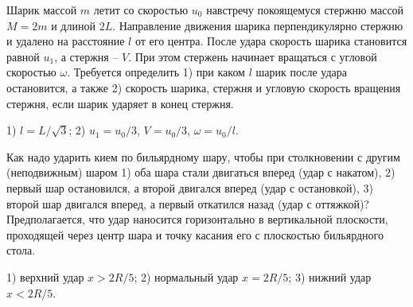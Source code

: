 \begin{ex}
Шарик массой $m$ летит со скоростью $u_0$ навстречу покоящемуся стержню массой $M = 2m$ и длиной $2L$. Направление движения шарика перпендикулярно стержню и удалено на расстояние $l$ от его центра. После удара скорость шарика становится равной $u_1$, а стержня -- $V$. При этом стержень начинает вращаться с угловой скоростью $\omega$. Требуется определить 1) при каком $l$ шарик после удара остановится, а также 2) скорость шарика, стержня и угловую скорость вращения стержня, если шарик ударяет в конец стержня.
\begin{ans}
1) $l = L/\sqrt{3}$; 2) $u_1 = u_0/3$, $V=u_0/3$, $\omega = u_0/l$.
\end{ans}
\end{ex}

\begin{ex}
Как надо ударить кием по бильярдному шару, чтобы при столкновении с другим (неподвижным) шаром 1) оба шара стали двигаться вперед (удар с накатом), 2) первый шар остановился, а второй двигался вперед (удар с остановкой), 3) второй шар двигался вперед, а первый откатился назад (удар с оттяжкой)? Предполагается, что удар наносится горизонтально в вертикальной плоскости, проходящей через центр шара и точку касания его с плоскостью бильярдного стола.
\begin{ans}
1) верхний удар $x > 2R/5$; 2) нормальный удар $x = 2R/5$; 3) нижний удар $x < 2R/5$.
\end{ans}
\end{ex}

